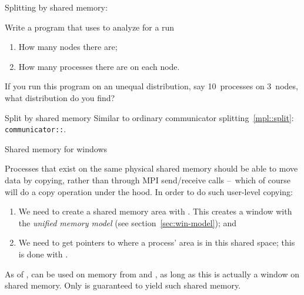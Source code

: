 Splitting by shared memory:
%
\begingroup
\def\snippetcodefraction{.45}
\def\snippettextfraction{.5}
\endgroup

\begin{exercise}
  \label{ex:mpi-node-proc-split}
  Write a program that uses 
  to  analyze for a run
  \begin{enumerate}
  \item How many nodes there are;
  \item How many processes there are on each node.
  \end{enumerate}
  If you run this program on an unequal distribution,
  say 10~processes on 3~nodes, what distribution do you find?
  
\end{exercise}

\begin{mplnote}{Split by shared memory}
  Similar to ordinary communicator splitting~\ref{mpl::split}:
  \lstinline+communicator::+.
\end{mplnote}

 {Shared memory for windows}

Processes that exist on the same physical shared memory should be able
to move data by copying, rather than through MPI send/receive calls
--~which of course will do a copy operation under the hood.
In order to do such user-level copying:
\begin{enumerate}
\item We need to create a shared memory area with
  .
  This creates a window with the
  \emph{unified memory model}
  (see section~\ref{sec:win-model});
  and
\item We need to get pointers to where a process' area is in this
  shared space; this is done with .
\end{enumerate}

\begin{remark}
  As of , 
  can be used on memory from 
  and ,
  as long as this is actually a window on shared memory.
  Only  is guaranteed
  to yield such shared memory.
\end{remark}

